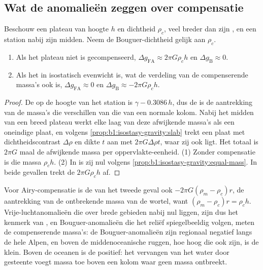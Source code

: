 \subsection*{Wat de anomalieën zeggen over compensatie}

\begin{proposition}\label{prop:b1:isostasy-gravity:broad}
Beschouw een plateau van hoogte $h$ en dichtheid $\rho_c$, veel breder dan zijn , en een station nabij zijn midden. Neem de Bouguer-dichtheid gelijk aan $\rho_c$.
\begin{enumerate}
  \item Als het plateau niet is gecompenseerd, $\Delta g_{\mathrm{FA}} \approx
        2\pi G\rho_c h$ en $\Delta g_{\mathrm B} \approx 0$.
  \item Als het in isostatisch evenwicht is, wat de verdeling van de compenserende massa's ook is, $\Delta g_{\mathrm{FA}} \approx 0$ en
        $\Delta g_{\mathrm B} \approx -2\pi G\rho_c h$.
\end{enumerate}
\end{proposition}

\begin{proof}
De  op de hoogte van het station is $\gamma - 0.3086\,h$, dus de  is de aantrekking van de massa's die verschillen van die van een normale kolom. Nabij het midden van een breed plateau werkt elke laag van deze afwijkende massa's als een oneindige plaat, en volgens \cref{prop:b1:isostasy-gravity:slab} trekt een plaat met dichtheidscontrast $\Delta\rho$ en dikte $t$ aan met $2\pi G\Delta\rho
t$, waar zij ook ligt. Het totaal is $2\pi G$ maal de afwijkende massa per oppervlakte-eenheid. (1) Zonder compensatie is die massa $\rho_c h$. (2) In  is zij nul volgens \cref{prop:b1:isostasy-gravity:equal-mass}. In beide gevallen trekt de  $2\pi G\rho_c h$ af.
\end{proof}

Voor Airy-compensatie is de  van het tweede geval ook $-2\pi G(\rho_m - \rho_c)r$, de aantrekking van de ontbrekende massa van de wortel, want $(\rho_m - \rho_c)r = \rho_c h$. Vrije-luchtanomalieën die over brede gebieden nabij nul liggen, zijn dus het kenmerk van , en Bouguer-anomalieën die het reliëf spiegelbeeldig volgen, meten de compenserende massa's: de Bouguer-anomalieën zijn regionaal negatief langs de hele Alpen, en boven de middenoceanische ruggen, hoe hoog die ook zijn, is de  klein. Boven de oceanen is de  positief: het vervangen van het water door gesteente voegt massa toe boven een kolom waar geen massa ontbreekt.

